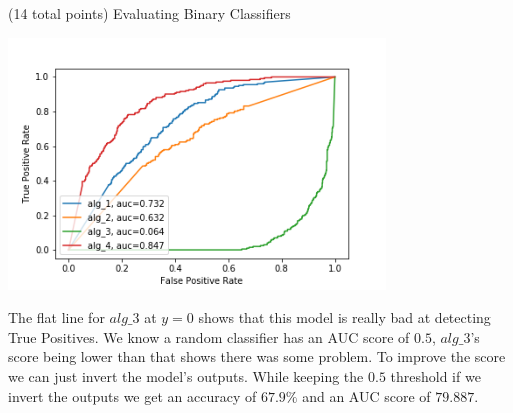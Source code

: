 \documentclass[12pt]{article}
\begin{document}
\begin{question}{(14 total points) Evaluating Binary Classifiers}
\begin{subquestion}
\begin{answerbox}{35em}
\begin{center}
    \includegraphics[width=0.75\textwidth]{results/roc-curves.png}
\end{center}    
The flat line for $alg\_3$ at $y=0$ shows that this model is really bad at detecting True Positives. We know a random classifier has an AUC score of $0.5$, $alg\_3$'s score being lower than that shows there was some problem. To improve  the score we can just invert the model's outputs. While keeping the $0.5$ threshold if we invert the outputs we get an accuracy of $67.9\%$ and an AUC score of $79.887$.
\end{answerbox}



\end{subquestion}

\end{question}
\end{document}
